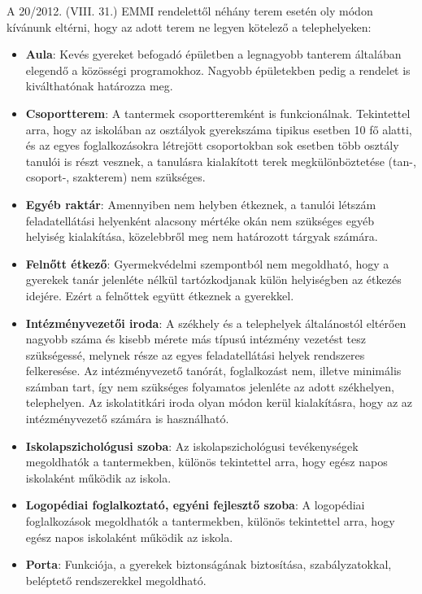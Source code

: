\documentclass{article}
\begin{document}
A 20/2012. (VIII. 31.) EMMI rendelettől néhány terem esetén oly módon
kívánunk eltérni, hogy az adott terem ne legyen kötelező a
telephelyeken:

\begin{itemize}
\item
  \textbf{Aula}: Kevés gyereket befogadó épületben a legnagyobb tanterem
  általában elegendő a közösségi programokhoz. Nagyobb épületekben pedig
  a rendelet is kiválthatónak határozza meg.
\item
  \textbf{Csoportterem}: A tantermek csoportteremként is funkcionálnak.
  Tekintettel arra, hogy az iskolában az osztályok gyerekszáma tipikus
  esetben 10 fő alatti, és az egyes foglalkozásokra létrejött
  csoportokban sok esetben több osztály tanulói is részt vesznek, a
  tanulásra kialakított terek megkülönböztetése (tan-, csoport-,
  szakterem) nem szükséges.
\item
  \textbf{Egyéb raktár}: Amennyiben nem helyben étkeznek, a tanulói
  létszám feladatellátási helyenként alacsony mértéke okán nem szükséges
  egyéb helyiség kialakítása, közelebbről meg nem határozott tárgyak
  számára.
\item
  \textbf{Felnőtt étkező}: Gyermekvédelmi szempontból nem megoldható,
  hogy a gyerekek tanár jelenléte nélkül tartózkodjanak külön
  helyiségben az étkezés idejére. Ezért a felnőttek együtt étkeznek a
  gyerekkel.
\item
  \textbf{Intézményvezetői iroda}: A székhely és a telephelyek
  általánostól eltérően nagyobb száma és kisebb mérete más típusú
  intézmény vezetést tesz szükségessé, melynek része az egyes
  feladatellátási helyek rendszeres felkeresése. Az intézményvezető
  tanórát, foglalkozást nem, illetve minimális számban tart, így nem
  szükséges folyamatos jelenléte az adott székhelyen, telephelyen. Az
  iskolatitkári iroda olyan módon kerül kialakításra, hogy az az
  intézményvezető számára is használható.
\item
  \textbf{Iskolapszichológusi szoba}: Az iskolapszichológusi
  tevékenységek megoldhatók a tantermekben, különös tekintettel arra,
  hogy egész napos iskolaként működik az iskola.
\item
  \textbf{Logopédiai foglalkoztató, egyéni fejlesztő szoba}: A
  logopédiai foglalkozások megoldhatók a tantermekben, különös
  tekintettel arra, hogy egész napos iskolaként működik az iskola.
\item
  \textbf{Porta}: Funkciója, a gyerekek biztonságának biztosítása,
  szabályzatokkal, beléptető rendszerekkel megoldható.

\end{itemize}
\end{document}
